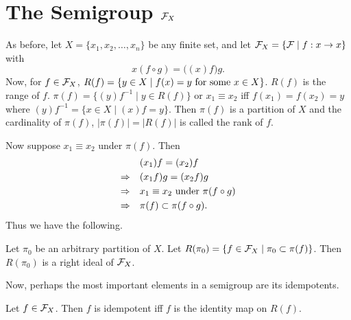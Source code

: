 


\section{The Semigroup $\mathcal{F}_X$}
\label{2.4}

As before, let $X = \{ x_1,x_2,\ldots,x_n\}$ be any finite set, and let $\mathcal{F}_X = \{ \mathcal{F} \mid f: x \to x\}$ with
\[
  x(f \circ g) = \big( (x)f \big) g.
\]
Now, for $f \in \mathcal{F}_X$, $R(f) = \{ y \in X \mid f(x) = y \hbox{ for some } x \in X\}$.  
$R(f)$ is the range of $f$.
$\pi(f) = \{ (y)f^{-1} \mid y \in R(f)\}$ or $x_1 \equiv x_2$ if{f} $f(x_1) = f(x_2) = y$ where $(y)f^{-1} = \{ x \in X \mid (x)f = y \}$.
Then $\pi(f)$ is a partition of $X$ and the cardinality of $\pi(f)$, $|\pi(f)| = |R(f)|$ is called the rank of $f$.

Now suppose $x_1 \equiv x_2$ under $\pi(f)$.  Then
\[
\begin{aligned}
           &(x_1)f = (x_2)f                        \\
       \Rightarrow \quad &(x_1f)g = (x_2f)g                \\
       \Rightarrow \quad &x_1 \equiv x_2 \hbox{ under }
               \pi(f \circ g)                      \\
       \Rightarrow \quad &\pi(f) \subset \pi(f \circ g).
     \end{aligned}
\]
Thus we have the following.

\begin{proposition} 	\label{prp:2.2}
Let $\pi_0$ be an arbitrary partition of $X$.
     Let $R(\pi_0) = \{ f \in \mathcal{F}_X \mid \pi_0 \subset \pi(f) \}$.  Then
     $R(\pi_0) $ is a right ideal of $\mathcal{F}_X$.
\end{proposition}

     Now, perhaps the most important elements in a semigroup are its
idempotents.

\begin{proposition} 	\label{prp:2.3}
Let $f \in \mathcal{F}_X$.  
Then $f$ is idempotent if{f} $f$ is the identity map on $R(f)$.
\end{proposition}

